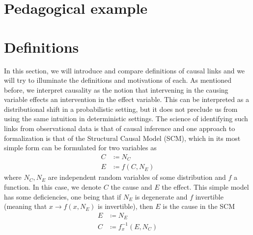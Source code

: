 \documentclass[11pt, a4paper]{memoir}
\begin{document}
\section{Pedagogical example}

\section{Definitions}
In this section, we will introduce and compare definitions of causal links and we will try to illuminate the definitions and motivations of each. As mentioned before, we interpret causality as the notion that intervening in the causing variable effects an intervention in the effect variable. This can be interpreted as a distributional shift in a probabilistic setting, but it does not preclude us from using the same intuition in deterministic settings. The science of identifying such links from observational data is that of causal inference and one approach to formalization is that of the Structural Causal Model (SCM), which in its most simple form can be formulated for two variables as
\begin{align*}
C&\coloneqq N_C\\
E&\coloneqq f(C,N_E)
\end{align*}
where $N_C,N_E$ are independent random variables of some distribution and $f$ a function. In this case, we denote $C$ the cause and $E$ the effect. This simple model has some deficiencies, one being that if $N_E$ is degenerate and $f$ invertible (meaning that $x\to f(x,N_E)$ is invertible), then $E$ is the cause in the SCM
\begin{align*}
E&\coloneqq N_E\\
C&\coloneqq f_x^{-1}(E,N_C)
\end{align*}
\end{document}
